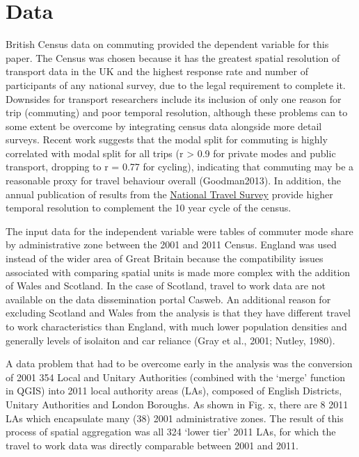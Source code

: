\section{Data}\label{data}

British Census data on commuting provided the dependent variable for
this paper. The Census was chosen because it has the greatest spatial
resolution of transport data in the UK and the highest response rate and
number of participants of any national survey, due to the legal
requirement to complete it. Downsides for transport researchers include
its inclusion of only one reason for trip (commuting) and poor temporal
resolution, although these problems can to some extent be overcome by
integrating census data alongside more detail surveys. Recent work
suggests that the modal split for commuting is highly correlated with
modal split for all trips (r \textgreater{} 0.9 for private modes and
public transport, dropping to r = 0.77 for cycling), indicating that
commuting may be a reasonable proxy for travel behaviour overall
(Goodman2013). In addition, the annual publication of results from the
\href{https://www.gov.uk/government/collections/national-travel-survey-statistics}{National
Travel Survey} provide higher temporal resolution to complement the 10
year cycle of the census.

The input data for the independent variable were tables of commuter mode
share by administrative zone between the 2001 and 2011 Census. England
was used instead of the wider area of Great Britain because the
compatibility issues associated with comparing spatial units is made
more complex with the addition of Wales and Scotland. In the case of
Scotland, travel to work data are not available on the data
dissemination portal Casweb. An additional reason for excluding Scotland
and Wales from the analysis is that they have different travel to work
characteristics than England, with much lower population densities and
generally levels of isolaiton and car reliance (Gray et al., 2001;
Nutley, 1980).

A data problem that had to be overcome early in the analysis was the
conversion of 2001 354 Local and Unitary Authorities (combined with the
`merge' function in QGIS) into 2011 local authority areas (LAs),
composed of English Districts, Unitary Authorities and London Boroughs.
As shown in Fig. x, there are 8 2011 LAs which encapsulate many (38)
2001 administrative zones. The result of this process of spatial
aggregation was all 324 `lower tier' 2011 LAs, for which the travel to
work data was directly comparable between 2001 and 2011.

